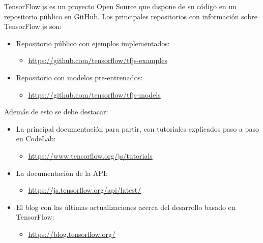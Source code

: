 TensorFlow.js es un proyecto Open Source que dispone de su código en un repositorio público en GitHub.
Los principales repositorios con información sobre TensorFlow.js son:
\begin{itemize}
    \item Repositorio público con ejemplos implementados:
    \begin{itemize}
        \item \url{https://github.com/tensorflow/tfjs-examples}
    \end{itemize}
    \item Repositorio con modelos pre-entrenados:
    \begin{itemize}
        \item \url{https://github.com/tensorflow/tfjs-models}
    \end{itemize}
\end{itemize}

Además de esto se debe destacar:

\begin{itemize}
    \item La principal documentación para partir, con tutoriales
    explicados paso a paso en CodeLab:
    \begin{itemize}
        \item \url{https://www.tensorflow.org/js/tutorials}
    \end{itemize}

    \item La documentación de la API:
    \begin{itemize}
        \item \url{https://js.tensorflow.org/api/latest/}
    \end{itemize}

    \item El blog con las últimas actualizaciones acerca del desarrollo basado en TensorFlow:
    \begin{itemize}
        \item \url{https://blog.tensorflow.org/}
    \end{itemize}
\end{itemize}



